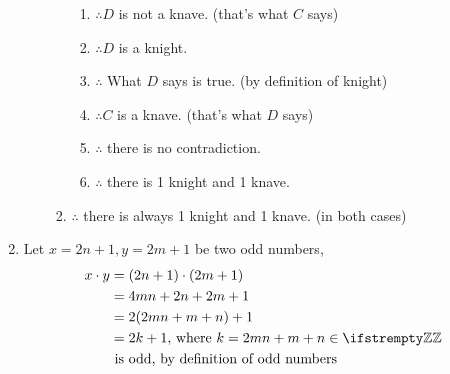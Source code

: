 \documentclass[12pt, a4paper]{article}
\begin{document}
\begin{enumerate}[Q\arabic*.]
\begin{enumerate}[(\alph*)]
\begin{enumerate}[label=\arabic*., itemsep=-2em]
\begin{enumerate}[label=1.\arabic*, itemsep=-2em]
            \item $\therefore D$ is not a knave. \hfill (that's what $C$ says)
            \item $\therefore D$ is a knight.
            \item $\therefore$ What $D$ says is true. \hfill (by definition of knight)
            \item $\therefore C$ is a knave. \hfill (that's what $D$ says)
            \item $\therefore$ there is no contradiction.
            \item $\therefore$ there is 1 knight and 1 knave.
          \end{enumerate}
          \item $\therefore$ there is always 1 knight and 1 knave. \hfill (in both cases)
      \end{enumerate}
    \end{enumerate}
  \item Let $x = 2n+1, y=2m+1$ be two odd numbers,
    \begin{align*}
      x\cdot y &= (2n+1)\cdot(2m+1) \\
               &= 4mn + 2n + 2m + 1 \\
               &= 2(2mn + m + n) + 1 \\
               &= 2k + 1 \text{, where $k=2mn+m+n \in \ZZ$} \\
               &\text{ is odd, by definition of odd numbers}
    \end{align*}
\end{enumerate}
\end{document}
